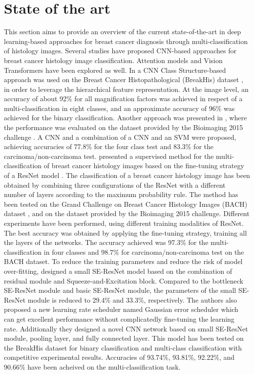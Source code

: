 \documentclass[
11pt, %
english, %
singlespacing, %
headsepline, %
]{project_structure}
\begin{document}
\section{State of the art}
 This section aims to provide an overview of the current state-of-the-art in deep learning-based approaches for breast cancer diagnosis through multi-classification of histology images.  Several studies have proposed CNN-based approaches \cite{CNNs} for breast cancer histology image classification. Attention models \cite{Att-Computer-Vision} and Vision Transformers \cite{Vit} have been explored as well. 
 \newline
In \cite{Structered-DL-Model} a CNN Class Structure-based approach was used on the Breast Cancer Histopathological (BreakHis) dataset \cite{BreakHis_DATASET}, in order to leverage the hierarchical feature representation. At the image level, an accuracy of about 92\% for all magnification factors was achieved in respect of a multi-classification in eight classes, and an approximate accuracy of 96\% was achieved for the binary classification. Another approach was presented in \cite{Classification_of_BRCA_hist_CNN}, where the performance was evaluated on the dataset provided by the Bioimaging 2015 challenge \cite{BIOIMAGING}. A CNN and a combination of a CNN and an SVM were proposed, achieving accuracies of 77.8\% for the four class test and 83.3\% for the carcinoma/non-carcinoma test.
\cite{brca-resnet-finetuning} presented a supervised method for the multi-classification of breast cancer histology images based on the fine-tuning strategy of a ResNet model \cite{ResNet-OG}. The classification of a breast cancer histology image has been obtained by combining three configurations of the ResNet with a different number of layers according to the maximum probability rule. The method has been tested on the Grand Challenge on Breast Cancer Histology Images (BACH) dataset \cite{BATCH}, and on the dataset provided by the Bioimaging 2015 challenge. Different experiments have been performed, using different training modalities of ResNet. The best accuracy was obtained by applying the fine-tuning strategy,
training all the layers of the networks. The accuracy achieved was 97.3\% for the multi-classification in four classes and 98.7\% for carcinoma/non-carcinoma test on the BACH dataset.
 To reduce the training parameters  and reduce the risk of model over-fitting, \cite{SE-RESNET} designed a small SE-ResNet model based on the combination of residual module and Squeeze-and-Excitation block. Compared to the bottleneck SE-ResNet module and basic SE-ResNet module, the parameters of the small SE-ResNet module is reduced to 29.4\% and 33.3\%, respectively. The authors also proposed a new learning rate scheduler named Gaussian error scheduler which can get excellent performance without complicatedly fine-tuning the learning rate. Additionally they designed a novel CNN network based on small SE-ResNet module, pooling layer, and fully connected layer. This model has been tested on the BreakHis dataset for binary classification and multi-class classification with competitive experimental results. Accuracies of 93.74\%, 93.81\%, 92.22\%, and 90.66\% have been acheived on the multi-classification task. 
\end{document}
